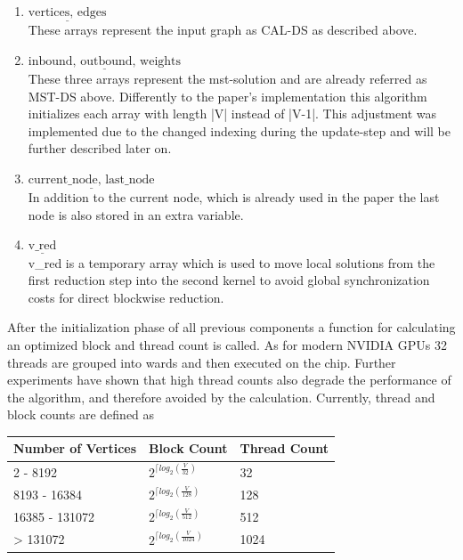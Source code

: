 \documentclass[sigconf,nonacm]{acmart}
\begin{document}
\begin{enumerate}
\item $\underline{\textrm{vertices, edges}}$\\
These arrays represent the input graph as CAL-DS as described above.

\item $\underline{\textrm{inbound, outbound, weights}}$\\
These three arrays represent the mst-solution and are already referred as MST-DS above. Differently to the paper’s implementation this algorithm initializes each array with length |V| instead of |V-1|. This adjustment was implemented due to the changed indexing during the update-step and will be further described later on.

\item $\underline{\textrm{current\_node, last\_node}}$\\
In addition to the current node, which is already used in the paper the last node is also stored in an extra variable.

\item $\underline{\textrm{v\_red}}$\\
v\_red is a temporary array which is used to move local solutions from the first reduction step into the second kernel to avoid global synchronization costs for direct blockwise reduction.

\end{enumerate}

After the initialization phase of all previous components a function for calculating an optimized block and thread count is called. As for modern NVIDIA GPUs 32 threads are grouped into wards and then executed on the chip. Further experiments have shown that high thread counts also degrade the performance of the algorithm, and therefore avoided by the calculation. Currently, thread and block counts are defined as

\begin{tabular}{|l|l|l|}
\hline
Number of Vertices & Block Count & Thread Count \\
\hline
2 - 8192 & $2^{\lceil log_2(\frac{V}{32})}$ & 32 \\
\hline
8193 - 16384 & $2^{\lceil log_2(\frac{V}{128})}$ & 128 \\
\hline
16385 - 131072 & $2^{\lceil log_2(\frac{V}{512})}$ & 512 \\
\hline
> 131072 & $2^{\lceil log_2(\frac{V}{1024})}$ & 1024 \\
\hline
\end{tabular}
\end{document}
